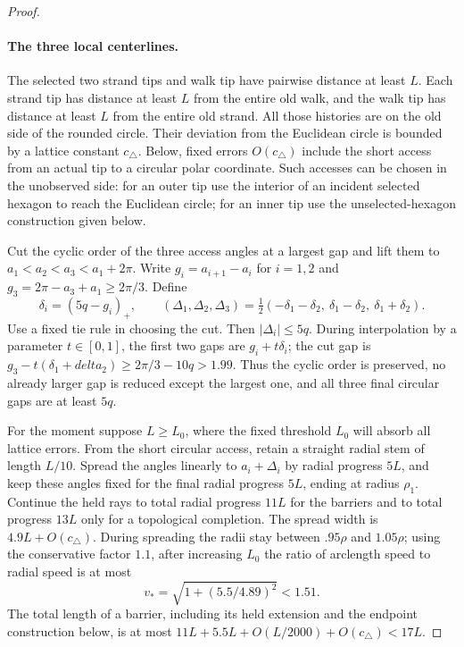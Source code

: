 \begin{proof}
\paragraph{The three local centerlines.}
The selected two strand tips and walk tip have pairwise distance at least
\(L\).  Each strand tip has distance at least \(L\) from the entire old
walk, and the walk tip has distance at least \(L\) from the entire old
strand.  All those histories are on the old side of the rounded circle.
Their deviation from the Euclidean circle is bounded by a lattice constant
\(c_\triangle\).  Below, fixed errors \(O(c_\triangle)\) include the
short access from an actual tip to a circular polar coordinate.  Such
accesses can be chosen in the unobserved side: for an outer tip use the
interior of an incident selected hexagon to reach the Euclidean circle;
for an inner tip use the unselected-hexagon construction given below.

Cut the cyclic order of the three access angles at a largest gap and lift
them to \(a_1<a_2<a_3<a_1+2\pi\).  Write
\(g_i=a_{i+1}-a_i\) for \(i=1,2\) and
\(g_3=2\pi-a_3+a_1\ge2\pi/3\).  Define
\[
 \delta_i=(5q-g_i)_+,\qquad
 (\Delta_1,\Delta_2,\Delta_3)
  =\tfrac12(-\delta_1-\delta_2,\ \delta_1-\delta_2,
                         \ \delta_1+\delta_2).                 \tag{G3a}
\]
Use a fixed tie rule in choosing the cut.  Then \(|\Delta_i|\le5q\).
During interpolation by a parameter \(t\in[0,1]\), the first two gaps
are \(g_i+t\delta_i\); the cut gap is
\(g_3-t(\delta_1+delta_2)\ge2\pi/3-10q>1.99\).
Thus the cyclic order is preserved, no already larger gap is reduced
except the largest one, and all three final circular gaps are at least
\(5q\).

For the moment suppose \(L\ge L_0\), where the fixed threshold \(L_0\)
will absorb all lattice errors.  From the short circular access, retain
a straight radial stem of length \(L/10\).  Spread the angles linearly
to \(a_i+\Delta_i\) by radial progress \(5L\), and keep these angles
fixed for the final radial progress \(5L\), ending at radius \(\rho_1\).
Continue the held rays to total radial progress \(11L\) for the barriers
and to total progress \(13L\) only for a topological completion.  The
spread width is \(4.9L+O(c_\triangle)\).  During spreading the radii
stay between \(.95\rho\) and \(1.05\rho\); using the conservative
factor \(1.1\), after increasing \(L_0\) the ratio of arclength speed
to radial speed is at most
\[
             v_* =\sqrt{1+(5.5/4.89)^2}<1.51.                 \tag{G3b}
\]
The total length of a barrier, including its held extension and the
endpoint construction below, is at most
\(11L+5.5L+O(L/2000)+O(c_\triangle)<17L\).


\end{proof}
